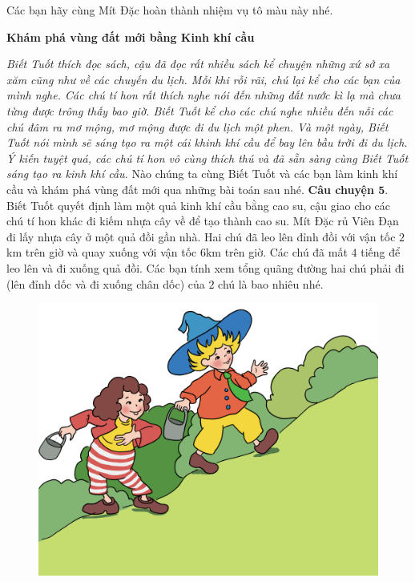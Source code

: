 	\vskip 0.1cm
	Các bạn hãy cùng Mít Đặc hoàn thành nhiệm vụ tô màu này nhé.
	\begin{center}
	\end{center}
	\centerline{\textbf{\color{toancuabi}Khám phá vùng đất mới bằng Kinh khí cầu}}
	\vskip 0.1cm
	\textit{Biết Tuốt thích đọc sách, cậu đã đọc rất nhiều sách kể chuyện những xứ sở xa xăm cũng như về các chuyến du lịch. Mỗi khi rỗi rãi, chú lại kể cho các bạn của mình nghe. Các chú tí hon rất thích nghe nói đến những đất nước kì lạ mà chưa từng được trông thấy bao giờ. Biết Tuốt kể cho các chú nghe nhiều đến nỗi các chú đâm ra mơ mộng, mơ mộng được đi du lịch một phen. Và một ngày, Biết Tuốt nói mình sẽ sáng tạo ra một cái khinh khí cầu để bay lên bầu trời đi du lịch. Ý kiến tuyệt quá, các chú tí hon vô cùng thích thú và đã sẵn sàng cùng Biết Tuốt sáng tạo ra kinh khí cầu.}
	\vskip 0.1cm
	Nào chúng ta cùng Biết Tuốt và các bạn làm kinh khí cầu và khám phá vùng đất mới qua những bài toán sau nhé.
	\vskip 0.1cm
	\textbf{\color{toancuabi}Câu chuyện $\pmb{5.}$} Biết Tuốt quyết định làm một quả kinh khí cầu bằng cao su, cậu giao cho các chú tí hon khác đi kiếm nhựa cây về để tạo thành cao su. Mít Đặc rủ Viên Đạn đi lấy nhựa cây ở một quả đồi gần nhà. Hai chú đã leo lên đỉnh đồi với vận tốc $2$km trên giờ và quay xuống với vận tốc $6$km trên giờ. Các chú đã mất $4$ tiếng để leo lên và đi xuống quả đồi. Các bạn tính xem tổng quãng đường hai chú phải đi (lên đỉnh dốc và đi xuống chân dốc) của $2$ chú là bao nhiêu nhé.
	\vskip 0.1cm
		\begin{figure}
		\centering
		\vspace*{-15pt}
		\captionsetup{labelformat= empty, justification=centering}
		\includegraphics[width=1\linewidth]{Hinh8_LayNhua}
		\vspace*{-15pt}
	\end{figure}
